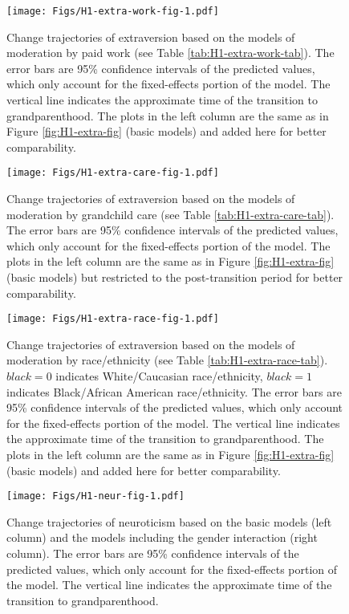 \documentclass[
  english,
  man,floatsintext]{apa7}
\begin{document}
\begin{figure}
\centering
\texttt{[image: Figs/H1-extra-work-fig-1.pdf]}
\caption{\label{fig:H1-extra-work-fig}Change trajectories of extraversion based on the models of moderation by paid work (see Table \ref{tab:H1-extra-work-tab}). The error bars are 95\% confidence intervals of the predicted values, which only account for the fixed-effects portion of the model. The vertical line indicates the approximate time of the transition to grandparenthood. The plots in the left column are the same as in Figure \ref{fig:H1-extra-fig} (basic models) and added here for better comparability.}
\end{figure}



\begin{figure}
\centering
\texttt{[image: Figs/H1-extra-care-fig-1.pdf]}
\caption{\label{fig:H1-extra-care-fig}Change trajectories of extraversion based on the models of moderation by grandchild care (see Table \ref{tab:H1-extra-care-tab}). The error bars are 95\% confidence intervals of the predicted values, which only account for the fixed-effects portion of the model. The plots in the left column are the same as in Figure \ref{fig:H1-extra-fig} (basic models) but restricted to the post-transition period for better comparability.}
\end{figure}



\begin{figure}
\centering
\texttt{[image: Figs/H1-extra-race-fig-1.pdf]}
\caption{\label{fig:H1-extra-race-fig}Change trajectories of extraversion based on the models of moderation by race/ethnicity (see Table \ref{tab:H1-extra-race-tab}). \(black=0\) indicates White/Caucasian race/ethnicity, \(black=1\) indicates Black/African American race/ethnicity. The error bars are 95\% confidence intervals of the predicted values, which only account for the fixed-effects portion of the model. The vertical line indicates the approximate time of the transition to grandparenthood. The plots in the left column are the same as in Figure \ref{fig:H1-extra-fig} (basic models) and added here for better comparability.}
\end{figure}



\begin{figure}
\centering
\texttt{[image: Figs/H1-neur-fig-1.pdf]}
\caption{\label{fig:H1-neur-fig}Change trajectories of neuroticism based on the basic models (left column) and the models including the gender interaction (right column). The error bars are 95\% confidence intervals of the predicted values, which only account for the fixed-effects portion of the model. The vertical line indicates the approximate time of the transition to grandparenthood.}
\end{figure}
\end{document}
